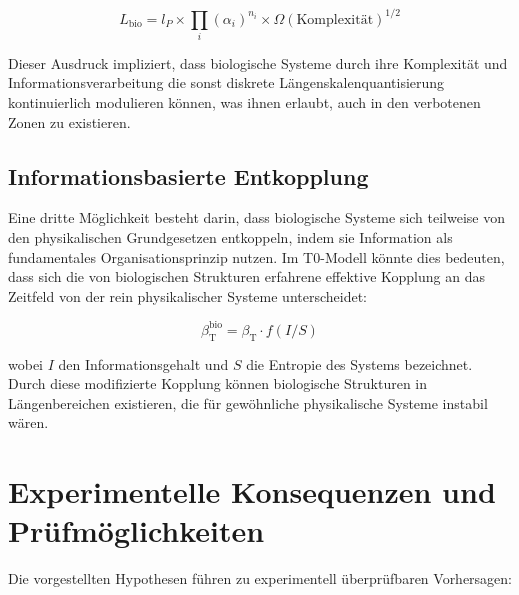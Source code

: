 \documentclass[12pt,a4paper]{article}
\newcommand{\betaT}{\beta_{\text{T}}}
\begin{document}
	\begin{equation}
		L_{\text{bio}} = l_P \times \prod_{i} (\alpha_i)^{n_i} \times \Omega(\text{Komplexität})^{1/2}
	\end{equation}
	
	Dieser Ausdruck impliziert, dass biologische Systeme durch ihre Komplexität und Informationsverarbeitung die sonst diskrete Längenskalenquantisierung kontinuierlich modulieren können, was ihnen erlaubt, auch in den verbotenen Zonen zu existieren.
	
	\subsection{Informationsbasierte Entkopplung}
	
	Eine dritte Möglichkeit besteht darin, dass biologische Systeme sich teilweise von den physikalischen Grundgesetzen entkoppeln, indem sie Information als fundamentales Organisationsprinzip nutzen. Im T0-Modell könnte dies bedeuten, dass sich die von biologischen Strukturen erfahrene effektive Kopplung an das Zeitfeld von der rein physikalischer Systeme unterscheidet:
	
	\begin{equation}
		\betaT^{\text{bio}} = \betaT \cdot f(I/S)
	\end{equation}
	
	wobei $I$ den Informationsgehalt und $S$ die Entropie des Systems bezeichnet. Durch diese modifizierte Kopplung können biologische Strukturen in Längenbereichen existieren, die für gewöhnliche physikalische Systeme instabil wären.
	
	\section{Experimentelle Konsequenzen und Prüfmöglichkeiten}
	
	Die vorgestellten Hypothesen führen zu experimentell überprüfbaren Vorhersagen:
	
\end{document}
